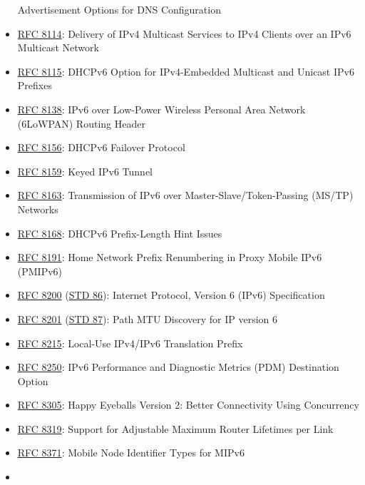 \documentclass[
]{article}
\begin{document}
\begin{itemize}
  Advertisement Options for DNS Configuration
\item
  \href{https://www.rfc-editor.org/info/rfc8114}{RFC 8114}: Delivery of
  IPv4 Multicast Services to IPv4 Clients over an IPv6 Multicast Network
\item
  \href{https://www.rfc-editor.org/info/rfc8115}{RFC 8115}: DHCPv6
  Option for IPv4-Embedded Multicast and Unicast IPv6 Prefixes
\item
  \href{https://www.rfc-editor.org/info/rfc8138}{RFC 8138}: IPv6 over
  Low-Power Wireless Personal Area Network (6LoWPAN) Routing Header
\item
  \href{https://www.rfc-editor.org/info/rfc8156}{RFC 8156}: DHCPv6
  Failover Protocol
\item
  \href{https://www.rfc-editor.org/info/rfc8159}{RFC 8159}: Keyed IPv6
  Tunnel
\item
  \href{https://www.rfc-editor.org/info/rfc8163}{RFC 8163}: Transmission
  of IPv6 over Master-Slave/Token-Passing (MS/TP) Networks
\item
  \href{https://www.rfc-editor.org/info/rfc8168}{RFC 8168}: DHCPv6
  Prefix-Length Hint Issues
\item
  \href{https://www.rfc-editor.org/info/rfc8191}{RFC 8191}: Home Network
  Prefix Renumbering in Proxy Mobile IPv6 (PMIPv6)
\item
  \href{https://www.rfc-editor.org/info/rfc8200}{RFC 8200}
  (\href{https://www.rfc-editor.org/info/std86}{STD 86}): Internet
  Protocol, Version 6 (IPv6) Specification
\item
  \href{https://www.rfc-editor.org/info/rfc8201}{RFC 8201}
  (\href{https://www.rfc-editor.org/info/std87}{STD 87}): Path MTU
  Discovery for IP version 6
\item
  \href{https://www.rfc-editor.org/info/rfc8215}{RFC 8215}: Local-Use
  IPv4/IPv6 Translation Prefix
\item
  \href{https://www.rfc-editor.org/info/rfc8250}{RFC 8250}: IPv6
  Performance and Diagnostic Metrics (PDM) Destination Option
\item
  \href{https://www.rfc-editor.org/info/rfc8305}{RFC 8305}: Happy
  Eyeballs Version 2: Better Connectivity Using Concurrency
\item
  \href{https://www.rfc-editor.org/info/rfc8319}{RFC 8319}: Support for
  Adjustable Maximum Router Lifetimes per Link
\item
  \href{https://www.rfc-editor.org/info/rfc8371}{RFC 8371}: Mobile Node
  Identifier Types for MIPv6
\item

\end{itemize}
\end{document}
